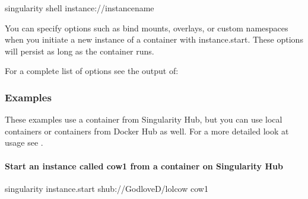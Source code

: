 \documentclass[letterpaper,10pt,english]{sphinxmanual}
\begin{document}
%
\begin{sphinxVerbatim}[commandchars=\\\{\}]
\PYGZdl{} singularity shell instance://\PYGZlt{}instance\PYGZus{}name\PYGZgt{}
\end{sphinxVerbatim}

You can specify options such as bind mounts, overlays, or custom
namespaces when you initiate a new instance of a container with
instance.start. These options will persist as long as the container
runs.

For a complete list of options see the output of:

%
\begin{sphinxVerbatim}[commandchars=\\\{\}]
  
\end{sphinxVerbatim}


\subsubsection{Examples}
\label{\detokenize{appendix:id47}}
These examples use a container from Singularity Hub, but you can use
local containers or containers from Docker Hub as well. For a more
detailed look at  usage see .


\paragraph{Start an instance called cow1 from a container on Singularity Hub}
\label{\detokenize{appendix:start-an-instance-called-cow1-from-a-container-on-singularity-hub}}
%
\begin{sphinxVerbatim}[commandchars=\\\{\}]
\PYGZdl{} singularity instance.start shub://GodloveD/lolcow cow1
\end{sphinxVerbatim}
\end{document}

